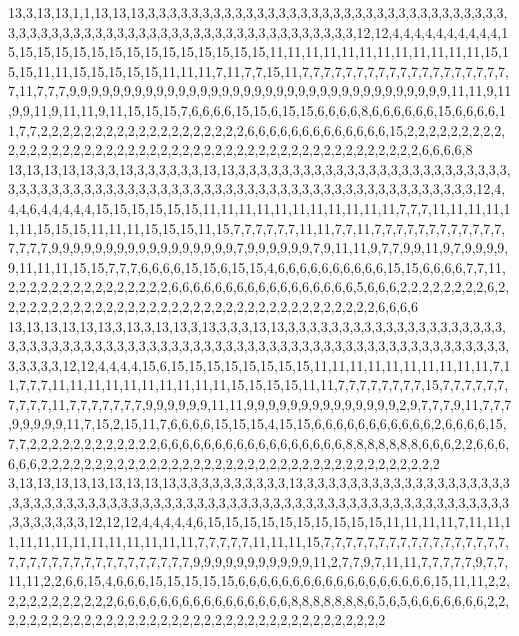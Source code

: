 13,3,13,13,1,1,13,13,13,3,3,3,3,3,3,3,3,3,3,3,3,3,3,3,3,3,3,3,3,3,3,3,3,3,3,3,3,3,3,3,3,3,3,3,3,3,3,3,3,3,3,3,3,3,3,3,3,3,3,3,3,3,3,3,3,3,3,3,3,3,3,3,3,3,12,12,4,4,4,4,4,4,4,4,4,4,15,15,15,15,15,15,15,15,15,15,15,15,15,15,15,11,11,11,11,11,11,11,11,11,11,11,11,15,15,15,11,11,15,15,15,15,15,11,11,11,7,11,7,7,15,11,7,7,7,7,7,7,7,7,7,7,7,7,7,7,7,7,7,7,7,7,11,7,7,7,9,9,9,9,9,9,9,9,9,9,9,9,9,9,9,9,9,9,9,9,9,9,9,9,9,9,9,9,9,9,9,9,9,9,9,11,11,9,11,9,9,11,9,11,11,9,11,15,15,15,7,6,6,6,6,15,15,6,15,15,6,6,6,6,8,6,6,6,6,6,6,15,6,6,6,6,11,7,7,2,2,2,2,2,2,2,2,2,2,2,2,2,2,2,2,2,2,2,6,6,6,6,6,6,6,6,6,6,6,6,6,15,2,2,2,2,2,2,2,2,2,2,2,2,2,2,2,2,2,2,2,2,2,2,2,2,2,2,2,2,2,2,2,2,2,2,2,2,2,2,2,2,2,2,2,2,2,2,2,6,6,6,6,8
13,13,13,13,13,3,3,13,3,3,3,3,3,3,13,13,3,3,3,3,3,3,3,3,3,3,3,3,3,3,3,3,3,3,3,3,3,3,3,3,3,3,3,3,3,3,3,3,3,3,3,3,3,3,3,3,3,3,3,3,3,3,3,3,3,3,3,3,3,3,3,3,3,3,3,3,3,3,3,3,3,3,3,3,12,4,4,4,6,4,4,4,4,4,15,15,15,15,15,15,11,11,11,11,11,11,11,11,11,11,11,7,7,7,11,11,11,11,11,11,15,15,15,11,11,11,15,15,15,11,15,7,7,7,7,7,7,11,11,7,7,11,7,7,7,7,7,7,7,7,7,7,7,7,7,7,7,7,9,9,9,9,9,9,9,9,9,9,9,9,9,9,9,9,9,7,9,9,9,9,9,9,7,9,11,11,9,7,7,9,9,11,9,7,9,9,9,9,9,11,11,11,15,15,7,7,7,6,6,6,6,15,15,6,15,15,4,6,6,6,6,6,6,6,6,6,6,15,15,6,6,6,6,7,7,11,2,2,2,2,2,2,2,2,2,2,2,2,2,2,2,6,6,6,6,6,6,6,6,6,6,6,6,6,6,6,6,6,5,6,6,6,2,2,2,2,2,2,2,2,6,2,2,2,2,2,2,2,2,2,2,2,2,2,2,2,2,2,2,2,2,2,2,2,2,2,2,2,2,2,2,2,2,2,2,2,6,6,6,6
13,13,13,13,13,13,3,13,3,13,13,3,13,3,3,3,13,13,3,3,3,3,3,3,3,3,3,3,3,3,3,3,3,3,3,3,3,3,3,3,3,3,3,3,3,3,3,3,3,3,3,3,3,3,3,3,3,3,3,3,3,3,3,3,3,3,3,3,3,3,3,3,3,3,3,3,3,3,3,3,3,3,3,3,3,3,3,3,3,12,12,4,4,4,4,15,6,15,15,15,15,15,15,15,15,11,11,11,11,11,11,11,11,11,11,7,11,7,7,7,11,11,11,11,11,11,11,11,11,11,15,15,15,15,11,11,7,7,7,7,7,7,7,7,15,7,7,7,7,7,7,7,7,7,7,11,7,7,7,7,7,7,7,9,9,9,9,9,9,11,11,9,9,9,9,9,9,9,9,9,9,9,9,9,9,2,9,7,7,7,9,11,7,7,7,9,9,9,9,9,11,7,15,2,15,11,7,6,6,6,6,15,15,15,4,15,15,6,6,6,6,6,6,6,6,6,6,6,2,6,6,6,6,15,7,7,2,2,2,2,2,2,2,2,2,2,2,2,6,6,6,6,6,6,6,6,6,6,6,6,6,6,6,6,6,8,8,8,8,8,8,8,6,6,6,2,2,6,6,6,6,6,6,2,2,2,2,2,2,2,2,2,2,2,2,2,2,2,2,2,2,2,2,2,2,2,2,2,2,2,2,2,2,2,2,2,2,2,2,2
3,13,13,13,13,13,13,13,13,13,3,3,3,3,3,3,3,3,3,3,13,3,3,3,3,3,3,3,3,3,3,3,3,3,3,3,3,3,3,3,3,3,3,3,3,3,3,3,3,3,3,3,3,3,3,3,3,3,3,3,3,3,3,3,3,3,3,3,3,3,3,3,3,3,3,3,3,3,3,3,3,3,3,3,3,3,3,3,3,3,3,3,3,12,12,12,4,4,4,4,4,6,15,15,15,15,15,15,15,15,15,15,11,11,11,11,7,11,11,11,11,11,11,11,11,11,11,11,11,11,7,7,7,7,7,11,11,11,15,7,7,7,7,7,7,7,7,7,7,7,7,7,7,7,7,7,7,7,7,7,7,7,7,7,7,7,7,7,7,7,7,7,7,9,9,9,9,9,9,9,9,9,9,9,11,2,7,7,9,7,11,11,7,7,7,7,7,9,7,7,11,11,2,2,6,6,15,4,6,6,6,15,15,15,15,15,6,6,6,6,6,6,6,6,6,6,6,6,6,6,6,6,6,6,15,11,11,2,2,2,2,2,2,2,2,2,2,2,2,6,6,6,6,6,6,6,6,6,6,6,6,6,6,6,6,8,8,8,8,8,8,8,6,5,6,5,6,6,6,6,6,6,6,2,2,2,2,2,2,2,2,2,2,2,2,2,2,2,2,2,2,2,2,2,2,2,2,2,2,2,2,2,2,2,2,2,2,2,2,2
